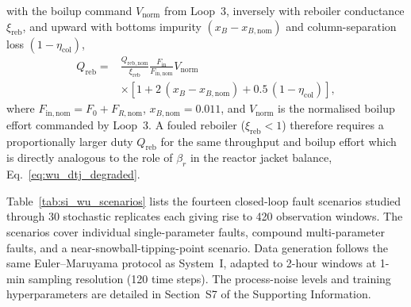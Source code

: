 \documentclass[aps,pre,twocolumn,superscriptaddress,floatfix]{revtex4-2}
\begin{document}
with the boilup command $V_\mathrm{norm}$ from Loop~3, inversely with reboiler conductance 
$\xi_\mathrm{reb}$, and upward with bottoms impurity $(x_B-x_{B,\mathrm{nom}})$ 
and column-separation loss $(1-\eta_\mathrm{col})$,
%
\begin{equation}
  \begin{aligned}
  Q_\mathrm{reb} ={}& \frac{Q_{\mathrm{reb,nom}}}{\xi_\mathrm{reb}}
    \frac{F_\mathrm{in}}{F_{\mathrm{in,nom}}} V_\mathrm{norm} \\
    &\times \left[1 + 2\,(x_B - x_{B,\mathrm{nom}}) + 0.5\,(1 - \eta_\mathrm{col})\right],
  \end{aligned}
  \label{eq:wu_qreb_degraded}
\end{equation}
%
where $F_{\mathrm{in,nom}} = F_0 + F_{R,\mathrm{nom}}$, $x_{B,\mathrm{nom}}=0.011$, and $V_\mathrm{norm}$ is the normalised boilup effort commanded by Loop~3. A fouled reboiler ($\xi_\mathrm{reb} < 1$) therefore requires a proportionally larger duty $Q_\mathrm{reb}$ for the same throughput and boilup effort which is directly analogous to the role of $\beta_r$ in the reactor jacket balance, Eq.~\eqref{eq:wu_dtj_degraded}.

Table~\ref{tab:si_wu_scenarios} lists the fourteen closed-loop fault scenarios studied through 30 stochastic replicates each giving rise to 420 observation windows. The scenarios cover individual single-parameter faults, compound multi-parameter faults, and a near-snowball-tipping-point scenario.  
Data generation follows the same Euler--Maruyama protocol as System~I, adapted to 2-hour windows at 1-min sampling resolution (120 time steps). The process-noise levels and training hyperparameters are detailed in Section~S7 of the Supporting Information.
\end{document}

